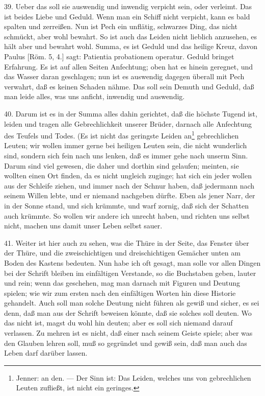 39. Ueber das soll sie auswendig und inwendig verpicht sein, oder verleimt. Das ist beides Liebe und Geduld. Wenn man ein Schiff nicht verpicht, kann es bald spalten und zerreißen. Nun ist Pech ein unflätig, schwarzes Ding, das nicht schmückt, aber wohl bewahrt. So ist auch das Leiden nicht lieblich anzusehen, es hält aber und bewahrt wohl. Summa, es ist Geduld und das heilige Kreuz, davon Paulus [Röm. 5, 4.] sagt: Patientia probationem operatur. Geduld bringet Erfahrung. Es ist auf allen Seiten Anfechtung; oben hat es hinein geregnet, und das Wasser daran geschlagen; nun ist es auswendig dagegen überall mit Pech verwahrt, daß es keinen Schaden nähme. Das soll sein Demuth und Geduld, daß man leide alles, was uns anficht, inwendig und auswendig.

40. Darum ist es in der Summa alles dahin gerichtet, daß die höchste Tugend ist, leiden und tragen alle Gebrechlichkeit unserer Brüder, darnach alle Anfechtung des Teufels und Todes. (Es ist nicht das geringste Leiden an\footnote{Jenner: an den. — Der Sinn ist: Das Leiden, welches uns von gebrechlichen Leuten zufließt, ist nicht ein geringes.} gebrechlichen Leuten; wir wollen immer gerne bei heiligen Leuten sein, die nicht wunderlich sind, sondern sich fein nach uns lenken, daß es immer gehe nach unserm Sinn. Darum sind viel gewesen, die daher und dorthin sind gelaufen; meinten, sie wollten einen Ort finden, da es nicht ungleich zuginge; hat sich ein jeder wollen aus der Schleife ziehen, und immer nach der Schnur haben, daß jedermann nach seinem Willen lebte, und er niemand nachgeben dürfte. Eben als jener Narr, der in der Sonne stand, und sich krümmte, und warf zornig, daß sich der Schatten auch krümmte. So wollen wir andere
ich unrecht haben, und richten uns selbst nicht, machen uns damit unser Leben selbst sauer.

41. Weiter ist hier auch zu sehen, was die Thüre in der Seite, das Fenster über der Thüre, und die zweischichtigen und dreischichtigen Gemächer unten am Boden des Kastens bedeuten. Nun habe ich oft gesagt, man solle vor allen Dingen bei der Schrift bleiben im einfältigen Verstande, so die Buchstaben geben, lauter und rein; wenn das geschehen, mag man darnach mit Figuren und Deutung spielen; wie wir zum ersten nach den einfältigen Worten hin diese Historie gehandelt. Auch soll man solche Deutung nicht führen als gewiß und sicher, es sei denn, daß man aus der Schrift beweisen könnte, daß sie solches soll deuten. Wo das nicht ist, magst du wohl hin deuten; aber es soll sich niemand darauf verlassen. Zu mehren ist es nicht, daß einer nach seinem Geiste spiele; aber was den Glauben lehren soll, muß so gegründet und gewiß sein, daß man auch das Leben darf darüber lassen.

